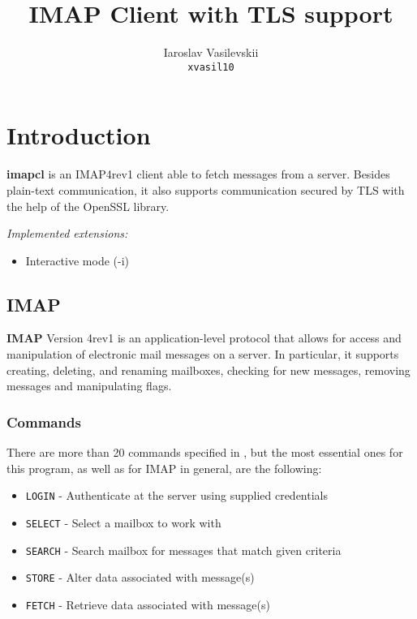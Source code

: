 \documentclass[a4]{report}
\title{IMAP Client with TLS support}
\author{Iaroslav Vasilevskii\\\texttt{xvasil10}}
\begin{document}
\maketitle
\tableofcontents

\chapter{Introduction}

{\Large\textbf{imapcl}} is an IMAP4rev1\cite{rfc3501} client able to fetch messages from a server. Besides plain-text communication, it also supports communication secured by TLS with the help of the OpenSSL library.

\bigskip
\noindent\textit{Implemented extensions:}
\begin{itemize}
  \item Interactive mode (-i)
\end{itemize}

\section{IMAP}

\textbf{IMAP} Version 4rev1 is an application-level protocol that allows for access and manipulation of electronic mail messages on a server. In particular, it supports creating, deleting, and renaming mailboxes, checking for new messages, removing messages and manipulating flags\cite{rfc3501}.

\subsection{Commands}

There are more than 20 commands specified in \cite{rfc3501}, but the most essential ones for this program, as well as for IMAP in general, are the following:

\begin{itemize}
  \item \texttt{LOGIN} - Authenticate at the server using supplied credentials
  \item \texttt{SELECT} - Select a mailbox to work with
  \item \texttt{SEARCH} - Search mailbox for messages that match given criteria
  \item \texttt{STORE} - Alter data associated with message(s)
  \item \texttt{FETCH} - Retrieve data associated with message(s)
\end{itemize}
\end{document}

